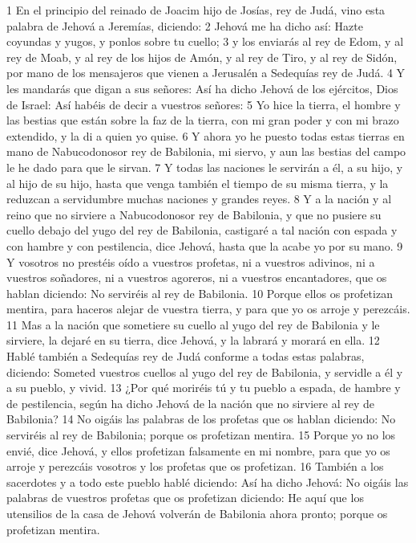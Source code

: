 1 En el principio del reinado de Joacim hijo de Josías, rey de Judá, vino esta palabra de Jehová a Jeremías, diciendo:
2 Jehová me ha dicho así: Hazte coyundas y yugos, y ponlos sobre tu cuello;
3 y los enviarás al rey de Edom, y al rey de Moab, y al rey de los hijos de Amón, y al rey de Tiro, y al rey de Sidón, por mano de los mensajeros que vienen a Jerusalén a Sedequías rey de Judá.
4 Y les mandarás que digan a sus señores: Así ha dicho Jehová de los ejércitos, Dios de Israel: Así habéis de decir a vuestros señores:
5 Yo hice la tierra, el hombre y las bestias que están sobre la faz de la tierra, con mi gran poder y con mi brazo extendido, y la di a quien yo quise.
6 Y ahora yo he puesto todas estas tierras en mano de Nabucodonosor rey de Babilonia, mi siervo, y aun las bestias del campo le he dado para que le sirvan.
7 Y todas las naciones le servirán a él, a su hijo, y al hijo de su hijo, hasta que venga también el tiempo de su misma tierra, y la reduzcan a servidumbre muchas naciones y grandes reyes.
8 Y a la nación y al reino que no sirviere a Nabucodonosor rey de Babilonia, y que no pusiere su cuello debajo del yugo del rey de Babilonia, castigaré a tal nación con espada y con hambre y con pestilencia, dice Jehová, hasta que la acabe yo por su mano.
9 Y vosotros no prestéis oído a vuestros profetas, ni a vuestros adivinos, ni a vuestros soñadores, ni a vuestros agoreros, ni a vuestros encantadores, que os hablan diciendo: No serviréis al rey de Babilonia.
10 Porque ellos os profetizan mentira, para haceros alejar de vuestra tierra, y para que yo os arroje y perezcáis.
11 Mas a la nación que sometiere su cuello al yugo del rey de Babilonia y le sirviere, la dejaré en su tierra, dice Jehová, y la labrará y morará en ella.
12 Hablé también a Sedequías rey de Judá conforme a todas estas palabras, diciendo: Someted vuestros cuellos al yugo del rey de Babilonia, y servidle a él y a su pueblo, y vivid.
13 ¿Por qué moriréis tú y tu pueblo a espada, de hambre y de pestilencia, según ha dicho Jehová de la nación que no sirviere al rey de Babilonia?
14 No oigáis las palabras de los profetas que os hablan diciendo: No serviréis al rey de Babilonia; porque os profetizan mentira.
15 Porque yo no los envié, dice Jehová, y ellos profetizan falsamente en mi nombre, para que yo os arroje y perezcáis vosotros y los profetas que os profetizan.
16 También a los sacerdotes y a todo este pueblo hablé diciendo: Así ha dicho Jehová: No oigáis las palabras de vuestros profetas que os profetizan diciendo: He aquí que los utensilios de la casa de Jehová volverán de Babilonia ahora pronto; porque os profetizan mentira.
